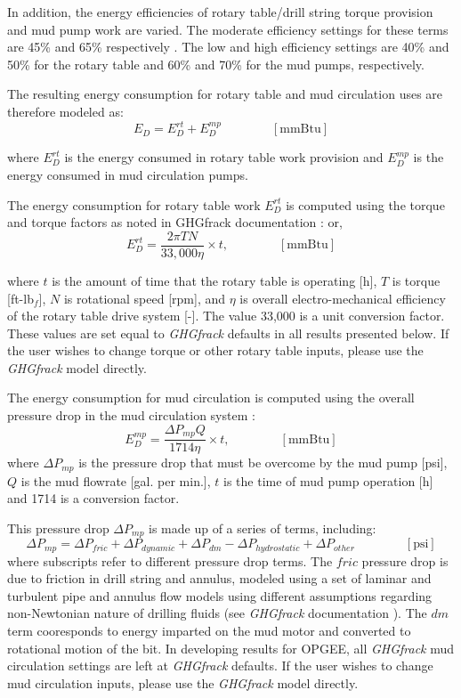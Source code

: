\documentclass[11pt]{report}
\newcommand{\eqnunit}[1]{\quad\quad \scriptstyle{\left[\text{#1}\right]}}
\begin{document}
In addition, the energy efficiencies of rotary table/drill string torque provision and mud pump work are varied. The moderate efficiency settings for these terms are 45\% and 65\% respectively \cite{Vafi2016b}.  The low and high efficiency settings are 40\% and 50\% for the rotary table and 60\% and 70\% for the mud pumps, respectively.

The resulting energy consumption for rotary table and mud circulation uses are therefore modeled as:
\begin{equation}
E_{D} = E_{D}^{rt} + E_{D}^{mp} \quad\quad\eqnunit{mmBtu}
\end{equation}

where $E_{D}^{rt}$ is the energy consumed in rotary table work provision and $E_{D}^{mp}$ is the energy consumed in mud circulation pumps.

The energy consumption for rotary table work $E_{D}^{rt}$ is computed using the torque and torque factors as noted in GHGfrack documentation \cite{Vafi2016b}:
or,
\begin{equation}
E_{D}^{rt} = \frac{2 \pi T N}{33,000 \eta} \times t, \quad\quad\eqnunit{mmBtu}
\end{equation}

where $t$ is the amount of time that the rotary table is operating [h], $T$ is torque [ft-lb$_f$], $N$ is rotational speed [rpm], and $\eta$ is overall electro-mechanical efficiency of the rotary table drive system [-]. The value 33,000 is a unit conversion factor.  These values are set equal to \emph{GHGfrack} defaults in all results presented below. If the user wishes to change torque or other rotary table inputs, please use the \emph{GHGfrack} model directly. 

The energy consumption for mud circulation is computed using the overall pressure drop in the mud circulation system \cite{Vafi2016b}:
\begin{equation}
E_{D}^{mp} = \frac{\Delta P_{mp} Q}{1714 \eta} \times t, \quad\quad\eqnunit{mmBtu}
\end{equation}
where $\Delta P_{mp}$ is the pressure drop that must be overcome by the mud pump [psi], $Q$ is the mud flowrate [gal. per min.], $t$ is the time of mud pump operation [h] and 1714 is a conversion factor.

This pressure drop $\Delta P_{mp}$ is made up of a series of terms, including:
\begin{equation}
\Delta P_{mp} = \Delta P_{fric} + \Delta P_{dynamic} + \Delta P_{dm} - \Delta P_{hydrostatic} + \Delta P_{other} \quad\quad\eqnunit{psi}
\end{equation}
where subscripts refer to different pressure drop terms.  The $fric$ pressure drop is due to friction in drill string and annulus, modeled using a set of laminar and turbulent pipe and annulus flow models using different assumptions regarding non-Newtonian nature of drilling fluids (see \emph{GHGfrack} documentation \cite{Vafi2016a, Vafi2016b}).  The $dm$ term cooresponds to energy imparted on the mud motor and converted to rotational motion of the bit.  In developing results for OPGEE, all \emph{GHGfrack} mud circulation settings are left at \emph{GHGfrack} defaults. If the user wishes to change mud circulation inputs, please use the \emph{GHGfrack} model directly. 
\end{document}
